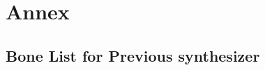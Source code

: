 \documentclass[../main.tex]{subfiles}
\begin{document}
\appendix
\renewcommand{\thesection}{\Alph{section}}
\renewcommand{\thesubsection}{\thesection.\arabic{subsection}}

\setcounter{figure}{0}  %
\setcounter{table}{0}   %
\renewcommand{\thefigure}{\Alph{section}.\arabic{figure}}  %
\renewcommand{\thetable}{\Alph{section}.\arabic{table}}  %

\setcounter{annexcounter}{0}  %

\section{Annex}
\label{annex}

\subsection{Bone List for Previous synthesizer}
\label{annex:background_work:old_bone_list}
\end{document}
